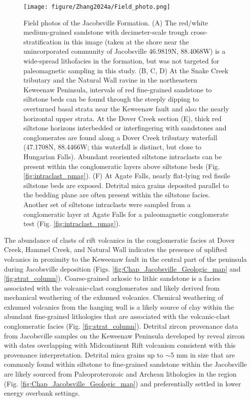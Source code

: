 \begin{figure}[h!]
\centering
\texttt{[image: figure/Zhang2024a/Field\_photo.png]}
\caption[Field photos of the Jacobsville Formation.]{\scriptsize Field photos of the Jacobsville Formation. (A) The red/white medium-grained sandstone with decimeter-scale trough cross-stratification in this image (taken at the shore near the unincorporated community of Jacobsville 46.9819\textdegree N, 88.4068\textdegree W) is a wide-spread lithofacies in the formation, but was not targeted for paleomagnetic sampling in this study. (B, C, D) At the Snake Creek tributary and the Natural Wall ravine in the northeastern Keweenaw Peninsula, intervals of red fine-grained sandstone to siltstone beds can be found through the steeply dipping to overturned basal strata near the Keweenaw fault and also the nearly horizontal upper strata. At the Dover Creek section (E), thick red siltstone horizons interbedded or interfingering with sandstones and conglomerates are found along a Dover Creek tributary waterfall (47.1708\textdegree N, 88.4466\textdegree W; this waterfall is distinct, but close to Hungarian Falls). Abundant reoriented siltstone intraclasts can be present within the conglomeratic layers above siltstone beds (Fig. \ref{fig:intraclast_pmag}). (F) At Agate Falls, nearly flat-lying red fissile siltstone beds are exposed. Detrital mica grains deposited parallel to the bedding plane are often present within the siltstone facies. Another set of siltstone intraclasts were sampled from a conglomeratic layer at Agate Falls for a paleomagnetic conglomerate test (Fig. \ref{fig:intraclast_pmag}).}
\label{fig:Field_photo}
\end{figure}

The abundance of clasts of rift volcanics in the conglomeratic facies at Dover Creek, Hammel Creek, and Natural Wall indicates the presence of uplifted volcanics in proximity to the Keweenaw fault in the central part of the peninsula during Jacobsville deposition (Figs. \ref{fig:Chap_Jacobsville_Geologic_map} and \ref{fig:strat_column}). Coarse-grained arkosic to lithic sandstone is a facies associated with the volcanic-clast conglomerates and likely derived from mechanical weathering of the exhumed volcanics. Chemical weathering of exhumed volcanics from the hanging wall is a likely source of clay within the abundant fine-grained lithologies that are associated with the volcanic-clast conglomeratic facies (Fig. \ref{fig:strat_column}). Detrital zircon provenance data from Jacobsville samples on the Keweenaw Peninsula developed by \cite{Malone2020a} reveal zircon with dates overlapping with Midcontinent Rift volcanism consistent with this provenance interpretation.  Detrital mica grains up to $\sim$5 mm in size that are commonly found within siltstone to fine-grained sandstone within the Jacobsville are likely sourced from Paleoproterozoic and Archean lithologies in the region (Fig. \ref{fig:Chap_Jacobsville_Geologic_map}) and preferentially settled in lower energy overbank settings.

